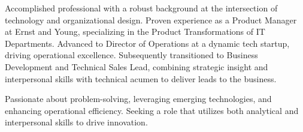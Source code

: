 

\begin{cvparagraph}

Accomplished professional with a robust background at the intersection of technology and organizational design. Proven experience as a Product Manager at Ernst and Young, specializing in the Product Transformations of IT Departments. Advanced to Director of Operations at a dynamic tech startup, driving operational excellence. Subsequently transitioned to Business Development and Technical Sales Lead, combining strategic insight and interpersonal skills with technical acumen to deliver leads to the business. 

Passionate about problem-solving, leveraging emerging technologies, and enhancing operational efficiency. Seeking a role that utilizes both analytical and interpersonal skills to drive innovation.
\end{cvparagraph}
